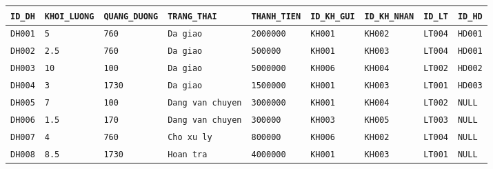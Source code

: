 \documentclass[11pt]{report}
\begin{document}
\begin{table}[H]
    \centering
    \renewcommand{\tabularxcolumn}[1]{m{#1}}
    \begin{tabularx}{\textwidth}{|>{\raggedright\arraybackslash\scriptsize}l|>{\raggedright\arraybackslash\scriptsize}l|>{\raggedright\arraybackslash\scriptsize}l|>{\raggedright\arraybackslash\scriptsize}l|>{\raggedright\arraybackslash\scriptsize}l|>{\raggedright\arraybackslash\scriptsize}l|>{\raggedright\arraybackslash\scriptsize}l|>{\raggedright\arraybackslash\scriptsize}l|>{\raggedright\arraybackslash\scriptsize}X|} \hline
        \rowcolor{teal!30}
        \textbf{\texttt{ID\_DH}} & \textbf{\texttt{KHOI\_LUONG}} & \textbf{\texttt{QUANG\_DUONG}} & \textbf{\texttt{TRANG\_THAI}} & \textbf{\texttt{THANH\_TIEN}} & \textbf{\texttt{ID\_KH\_GUI}} & \textbf{\texttt{ID\_KH\_NHAN}} & \textbf{\texttt{ID\_LT}} & \textbf{\texttt{ID\_HD}} \\ \hline
        \texttt{DH001} & \texttt{5}   & \texttt{760}  & \texttt{Da giao}         & \texttt{2000000}  & \texttt{KH001} & \texttt{KH002} & \texttt{LT004} & \texttt{HD001} \\ \hline
        \texttt{DH002} & \texttt{2.5} & \texttt{760}  & \texttt{Da giao}         & \texttt{500000}   & \texttt{KH001} & \texttt{KH003} & \texttt{LT004} & \texttt{HD001} \\ \hline
        \texttt{DH003} & \texttt{10}  & \texttt{100}  & \texttt{Da giao}         & \texttt{5000000}  & \texttt{KH006} & \texttt{KH004} & \texttt{LT002} & \texttt{HD002} \\ \hline
        \texttt{DH004} & \texttt{3}   & \texttt{1730} & \texttt{Da giao}         & \texttt{1500000}  & \texttt{KH001} & \texttt{KH003} & \texttt{LT001} & \texttt{HD003} \\ \hline
        \texttt{DH005} & \texttt{7}   & \texttt{100}  & \texttt{Dang van chuyen} & \texttt{3000000}  & \texttt{KH001} & \texttt{KH004} & \texttt{LT002} & \texttt{NULL} \\ \hline
        \texttt{DH006} & \texttt{1.5} & \texttt{170}  & \texttt{Dang van chuyen} & \texttt{300000}   & \texttt{KH003} & \texttt{KH005} & \texttt{LT003} & \texttt{NULL} \\ \hline
        \texttt{DH007} & \texttt{4}   & \texttt{760}  & \texttt{Cho xu ly}       & \texttt{800000}   & \texttt{KH006} & \texttt{KH002} & \texttt{LT004} & \texttt{NULL} \\ \hline
        \texttt{DH008} & \texttt{8.5} & \texttt{1730} & \texttt{Hoan tra}        & \texttt{4000000}  & \texttt{KH001} & \texttt{KH003} & \texttt{LT001} & \texttt{NULL} \\ \hline

\end{tabularx}
\end{table}
\end{document}
